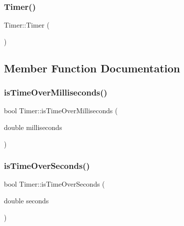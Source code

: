 \mbox{\label{class_timer_a5f16e8da27d2a5a5242dead46de05d97}} 
\subsubsection{\texorpdfstring{Timer()}{Timer()}}
{\footnotesize\ttfamily Timer\+::\+Timer (\begin{DoxyParamCaption}{ }\end{DoxyParamCaption})}



\subsection{Member Function Documentation}
\mbox{\label{class_timer_ab12a809d6520150d9eeec6b5f5511854}} 
\subsubsection{\texorpdfstring{is\+Time\+Over\+Milliseconds()}{isTimeOverMilliseconds()}}
{\footnotesize\ttfamily bool Timer\+::is\+Time\+Over\+Milliseconds (\begin{DoxyParamCaption}\item[{double}]{milliseconds }\end{DoxyParamCaption})}

\mbox{\label{class_timer_a99830a54e401b61cdf0777940f6e36e7}} 
\subsubsection{\texorpdfstring{is\+Time\+Over\+Seconds()}{isTimeOverSeconds()}}
{\footnotesize\ttfamily bool Timer\+::is\+Time\+Over\+Seconds (\begin{DoxyParamCaption}\item[{double}]{seconds }\end{DoxyParamCaption})}

\mbox{\label{class_timer_a3a8b5272198d029779dc9302a54305a8}} 
